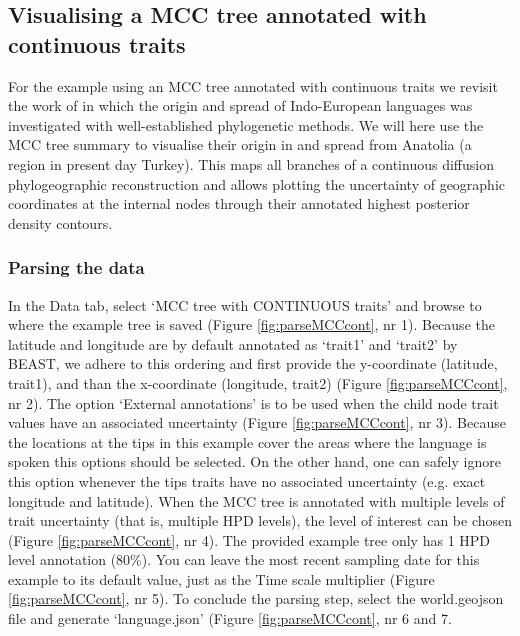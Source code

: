 \documentclass[english]{paper}
\begin{document}
\subsection{Visualising a MCC tree annotated with continuous traits}
\label{MCCcontinuous}

For the example using an MCC tree annotated with continuous traits we revisit the work of \citet{Bouckaert:2012aa} in which the origin and spread of Indo-European languages was investigated with well-established phylogenetic methods.
We will here use the MCC tree summary to visualise their origin in and spread from Anatolia (a region in present day Turkey). 
This maps all branches of a continuous diffusion phylogeographic reconstruction and allows plotting the uncertainty of geographic coordinates at the internal nodes through their annotated highest posterior density contours.

\subsubsection{Parsing the data}
\label{MCCcontParse}

In the Data tab, select `MCC tree with CONTINUOUS traits' and browse to where the example tree is saved (Figure \ref{fig:parseMCCcont}, nr 1).
Because the latitude and longitude are by default annotated as `trait1' and `trait2' by BEAST, we adhere to this ordering and first provide the y-coordinate (latitude, trait1), and than the x-coordinate (longitude, trait2) (Figure \ref{fig:parseMCCcont}, nr 2).
The option `External annotations' %
is to be used when the child node trait values have an associated uncertainty (Figure \ref{fig:parseMCCcont}, nr 3).
Because the locations at the tips in this example cover the areas where the language is spoken this options should be selected.
On the other hand, one can safely ignore this option whenever the tips traits have no associated uncertainty (e.g. exact longitude and latitude). 
When the MCC tree is annotated with multiple levels of trait uncertainty (that is, multiple HPD levels), the level of interest can be chosen (Figure \ref{fig:parseMCCcont}, nr 4).
The provided example tree only has 1 HPD level annotation (80\%).
You can leave the most recent sampling date for this example to its default value, just as the Time scale multiplier (Figure \ref{fig:parseMCCcont}, nr 5).
To conclude the parsing step, select the world.geojson file and generate `language.json' (Figure \ref{fig:parseMCCcont}, nr 6 and 7.
\end{document}
